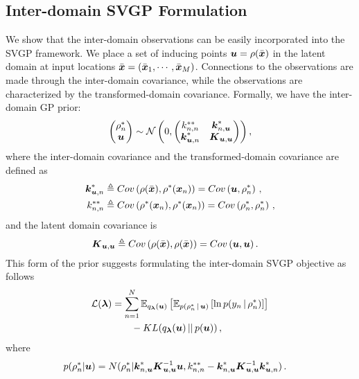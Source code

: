 \subsection{Inter-domain SVGP Formulation}
\label{sec:method-interdomain-svgp}
We show that the inter-domain observations can be easily incorporated into the SVGP framework.
We place a set of inducing points $\boldsymbol{u} = \rho(\bar{\boldsymbol{x}})$ in the latent domain
at input locations $\bar{\boldsymbol{x}} = \left( \bar{\boldsymbol{x}}_1, \cdots, \bar{\boldsymbol{x}}_M \right)$.
Connections to the observations are made through the
inter-domain covariance,
while the observations are characterized by
the transformed-domain covariance.
Formally, we have the inter-domain GP prior:
\begin{align}
  \label{eq:inter-domain-GP}
\begin{pmatrix}
\rho_n^* \\
\boldsymbol{u}
\end{pmatrix}
\sim \mathcal{N} \left( 0,
\begin{pmatrix}
 k^{**}_{n,n} & \boldsymbol{k}^*_{n, \boldsymbol{u}} \\
 \boldsymbol{k}^*_{\boldsymbol{u}, n} & \boldsymbol{K}_{\boldsymbol{u}, \boldsymbol{u}} \\
\end{pmatrix}
\right),
\end{align}
where the inter-domain covariance and the transformed-domain covariance are defined as
\begin{align}
\label{eq:domain-kernel}
\boldsymbol{k}^*_{\boldsymbol{u}, n} &\triangleq Cov \left(\rho(\bar{\boldsymbol{x}}), \rho^*(\boldsymbol{x}_n)\right)
 = Cov \left(\boldsymbol{u}, \rho^*_n \right)  \, , \\
\label{eq:domain-kernel2}
k^{**}_{n,n} &\triangleq Cov \left(\rho^*(\boldsymbol{x}_n), \rho^*(\boldsymbol{x}_n) \right)
 = Cov \left( \rho^*_n, \rho^*_n  \right) \, , 
\end{align}
and the latent domain covariance is
\begin{align}
  \boldsymbol{K}_{\boldsymbol{u}, \boldsymbol{u}} &\triangleq Cov \left( \rho (\bar{\boldsymbol{x}}), \rho (\bar{\boldsymbol{x}}) \right)
    = Cov \left( \boldsymbol{u}, \boldsymbol{u} \right).
\end{align}
This form of the prior suggests formulating the inter-domain SVGP objective
as follows
\begin{align}
\mathcal{L}({\boldsymbol{\lambda}}) \label{eq:inter-domain-svgp} &= \sum_{n=1}^N \mathbb{E}_{q_{{\boldsymbol{\lambda}}}(\boldsymbol{u})}\left[
      \mathbb{E}_{p(\rho_n^* \,|\, \boldsymbol{u})} \left[ \ln p(y_n \,|\, \rho_n^*) \right] \right] \\
& \qquad  - KL(q_{{\boldsymbol{\lambda}}}(\boldsymbol{u})\,||\,p(\boldsymbol{u})) \nonumber\,,
\end{align}
where
\begin{align*}
  p(\rho_n^* | \boldsymbol{u}) &= N(\rho_n^* | \boldsymbol{k}_{n,\boldsymbol{u}}^* \boldsymbol{K}_{\boldsymbol{u}, \boldsymbol{u}}^{-1} \boldsymbol{u},
  k_{n,n}^{**} - \boldsymbol{k}_{n,\boldsymbol{u}}^* \boldsymbol{K}_{\boldsymbol{u}, \boldsymbol{u}}^{-1} \boldsymbol{k}_{\boldsymbol{u}, n}^*)\,.
\end{align*}
